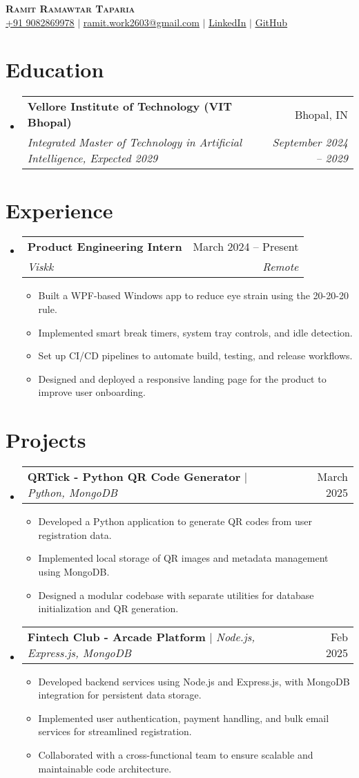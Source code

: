 \documentclass[letterpaper,11pt]{article}
\makeatletter
\newcommand{\resumeItem}[1]{
  \item\small{
    {#1 \vspace{-2pt}}
  }
}
\newcommand{\resumeSubheading}[4]{
  \vspace{-2pt}\item
    \begin{tabular*}{0.97\textwidth}[t]{l@{\extracolsep{\fill}}r}
      \textbf{#1} & #2 \\
      \textit{\small#3} & \textit{\small #4} \\
    \end{tabular*}\vspace{-7pt}
}
\newcommand{\resumeProjectHeading}[2]{
    \item
    \begin{tabular*}{0.97\textwidth}{l@{\extracolsep{\fill}}r}
      \small#1 & #2 \\
    \end{tabular*}\vspace{-7pt}
}
\newcommand{\resumeSubHeadingListStart}{\begin{itemize}[leftmargin=0.15in, label={}]}
\newcommand{\resumeSubHeadingListEnd}{\end{itemize}}
\newcommand{\resumeItemListStart}{\begin{itemize}}
\newcommand{\resumeItemListEnd}{\end{itemize}\vspace{-5pt}}
\makeatother
\begin{document}
\begin{center}
    \textbf{\Huge \scshape Ramit Ramawtar Taparia} \\ \vspace{1pt}
    \href{tel:+919082869978}{\underline{+91 9082869978}} $|$ \href{mailto:ramit.work2603@gmail.com}{\underline{ramit.work2603@gmail.com}} $|$ 
    \href{https://www.linkedin.com/in/ramit-taparia/}{\underline{LinkedIn}} $|$
    \href{https://github.com/foundRamit}{\underline{GitHub}}
\end{center}

\section{Education}
  \resumeSubHeadingListStart
    \resumeSubheading
      {Vellore Institute of Technology (VIT Bhopal)}{Bhopal, IN}
      {Integrated Master of Technology in Artificial Intelligence, Expected 2029}{September 2024 -- 2029}
  \resumeSubHeadingListEnd

\section{Experience}
  \resumeSubHeadingListStart
   \resumeSubheading
      {Product Engineering Intern}{March 2024 -- Present}
      {Viskk}{Remote}
      \resumeItemListStart
       \resumeItem{Built a WPF-based Windows app to reduce eye strain using the 20-20-20 rule.}
        \resumeItem{Implemented smart break timers, system tray controls, and idle detection.}
        \resumeItem{Set up CI/CD pipelines to automate build, testing, and release workflows.}
        \resumeItem{Designed and deployed a responsive landing page for the product to improve user onboarding.}
      \resumeItemListEnd
  \resumeSubHeadingListEnd

\section{Projects}
\resumeSubHeadingListStart
  \resumeProjectHeading
      {\textbf{QRTick - Python QR Code Generator} $|$ \emph{Python, MongoDB}}{March 2025}
      \resumeItemListStart
        \resumeItem{Developed a Python application to generate QR codes from user registration data.}
        \resumeItem{Implemented local storage of QR images and metadata management using MongoDB.}
        \resumeItem{Designed a modular codebase with separate utilities for database initialization and QR generation.}
      \resumeItemListEnd
  \resumeProjectHeading
      {\textbf{Fintech Club - Arcade Platform} $|$ \emph{Node.js, Express.js, MongoDB}}{Feb 2025}
      \resumeItemListStart
        \resumeItem{Developed backend services using Node.js and Express.js, with MongoDB integration for persistent data storage.}
        \resumeItem{Implemented user authentication, payment handling, and bulk email services for streamlined registration.}
        \resumeItem{Collaborated with a cross-functional team to ensure scalable and maintainable code architecture.}
      \resumeItemListEnd
\resumeSubHeadingListEnd
\end{document}
